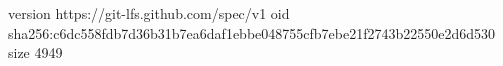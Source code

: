 version https://git-lfs.github.com/spec/v1
oid sha256:c6dc558fdb7d36b31b7ea6daf1ebbe048755cfb7ebe21f2743b22550e2d6d530
size 4949
